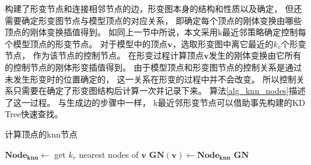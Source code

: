 构建了形变节点和连接相邻节点的边，形变图本身的结构和性质以及确定，
但还需要确定形变图节点与模型顶点的对应关系，
即确定每个顶点的刚体变换由哪些顶点的刚体变换插值得到。
如同上一节中所说，本文采用k最近邻策略确定控制每个模型顶点的形变节点。
对于模型中的顶点$\bm{v}$，选取形变图中离它最近的$k_v$个形变节点，
作为该节点的控制节点。
在形变过程计算顶点$\bm{v}$发生的刚体变换由它所有的控制节点的刚体形变插值得到。
由于模型顶点和形变图节点的控制关系是通过未发生形变时的位置确定的，
这一关系在形变的过程中并不会改变。
所以控制关系只需要在确定了形变图结构后计算一次并记录下来。
算法\ref{alg_knn_nodes}描述了这一过程。
与生成边的步骤中一样，
k最近邻形变节点可以借助事先构建的KD Tree快速查找。
\begin{algorithm}
    \caption{计算顶点的knn节点}
    \label{alg_knn_nodes}
    \begin{algorithmic}[1]
                \State $\bm{Node_{knn}} \gets$ get $k_v$ nearest nodes of $\bm{v}$
                \State $\bm{GN}(\bm{v}) \gets \bm{Node_{knn}}$
            \EndFor
            \State \Return $\bm{GN}$
        \EndFunction
    \end{algorithmic}
\end{algorithm} 

